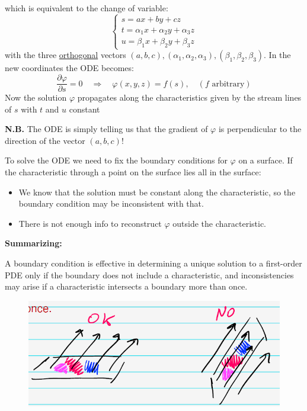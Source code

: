 \documentclass{article}
\newcommand{\vp}{\varphi}
\begin{document}
which is equivalent to the change of variable:
\begin{equation}
    \begin{cases}
        s = ax + by + cz \\ t = \alpha_1 x + \alpha_2 y + \alpha_3 z \\ u = \beta_1 x + \beta_2 y + \beta_3 z
    \end{cases}
\end{equation}
with the three \underline{orthogonal} vectors $(a,b,c), (\alpha_1, \alpha_2, \alpha_3), (\beta_1, \beta_2, \beta_3)$. In the new coordinates the ODE becomes:
\begin{equation}
    \frac{\partial \vp}{\partial s} = 0 \quad \Rightarrow \quad \vp(x,y,z) = f(s), \quad (f \text{ arbitrary})
\end{equation}
Now the solution $\vp$ propagates along the characteristics given by the stream lines of $s$ with $t$ and $u$ constant

\noindent
\textbf{N.B.} The ODE is simply telling us that the gradient of $\vp$ is perpendicular to the direction of the vector $(a,b,c)$!

\vspace{2mm}\noindent
To solve the ODE we need to fix the boundary conditions for $\vp$ on a surface. If the characteristic through a point on the surface lies all in the surface:
\begin{itemize}
    \item We know that the solution must be constant along the characteristic, so the boundary condition may be inconsistent with that.
    \item There is not enough info to reconstruct $\vp$ outside the characteristic.
\end{itemize}

\newpage

\noindent
\textbf{Summarizing:}

\noindent
A boundary condition is effective in determining a unique solution to a first-order PDE only if the boundary does not include a characteristic, and inconsistencies may arise if a characteristic intersects a boundary more than once.

\begin{figure}[h]
    \centering
    \includegraphics[width=0.5\linewidth]{fig56.png}
\end{figure}
\end{document}
